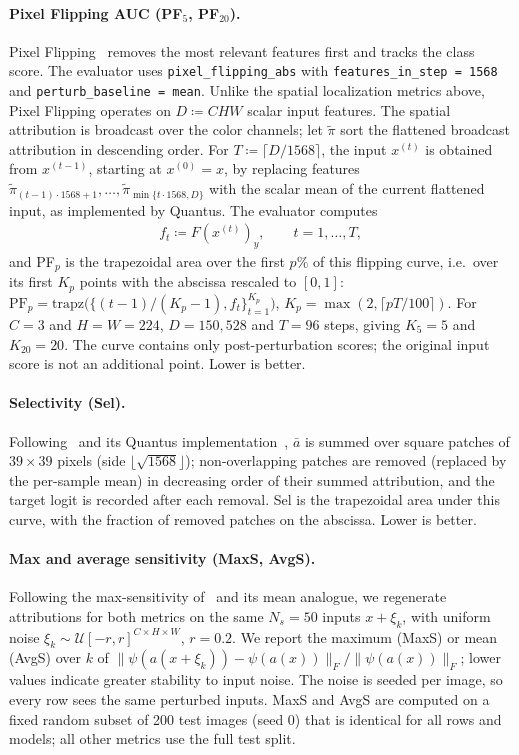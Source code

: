 \paragraph{Pixel Flipping AUC (PF$_5$, PF$_{20}$).} Pixel Flipping~\parencite{Bach2015,Samek2017evaluating} removes the most relevant features first
and tracks the class score. The evaluator uses \texttt{pixel\_flipping\_abs} with
\texttt{features\_in\_step = 1568} and \texttt{perturb\_baseline = mean}. Unlike the spatial
localization metrics above, Pixel Flipping operates on $D \coloneqq CHW$ scalar input features.
The spatial attribution is broadcast over the color channels; let $\widetilde\pi$ sort the
flattened broadcast attribution in descending order. For $T \coloneqq \lceil D/1568 \rceil$, the
input $x^{(t)}$ is obtained from $x^{(t-1)}$, starting at $x^{(0)}=x$, by replacing features
$\widetilde\pi_{(t-1)\cdot1568+1},\dots,\widetilde\pi_{\min\{t\cdot1568,D\}}$ with the scalar mean
of the current flattened input, as implemented by Quantus.
The evaluator computes
\begin{align}
    f_t \coloneqq F(x^{(t)})_y, \qquad t = 1, \dots, T,
\end{align}
and PF$_p$ is the trapezoidal area over the first $p\%$ of this flipping curve, i.e.\ over its
first $K_p$ points with the abscissa rescaled to $[0,1]$: $\text{PF}_p =
    \text{trapz}\bigl(\{(t-1)/(K_p-1), f_t\}_{t=1}^{K_p}\bigr)$, $K_p = \max(2, \lceil pT/100 \rceil)$.
For $C=3$ and $H=W=224$, $D=150{,}528$ and $T=96$ steps, giving $K_5=5$ and $K_{20}=20$.
The curve contains only post-perturbation scores; the original input score is not an additional
point. Lower is better.

\paragraph{Selectivity (Sel).}
Following~\textcite{Montavon2018} and its Quantus implementation~\parencite{Hedstrom2023}, $\bar{a}$ is summed over square patches of $39{\times}39$ pixels (side $\lfloor\sqrt{1568}\rfloor$); non-overlapping patches are removed (replaced by the per-sample mean) in decreasing order of their summed attribution, and the target logit is recorded after each removal. Sel is the trapezoidal area under this curve, with the fraction of removed patches on the abscissa. Lower is better.

\paragraph{Max and average sensitivity (MaxS, AvgS).} Following the max-sensitivity of~\textcite{Yeh2019} and its mean analogue, we regenerate attributions for both metrics on the same $N_s = 50$ inputs $x + \xi_k$, with uniform noise $\xi_k \sim \mathcal{U}[-r, r]^{C \times H
    \times W}$, $r = 0.2$. We report the maximum (MaxS) or mean (AvgS) over $k$ of $\|\psi(a(x+\xi_k)) - \psi(a(x))\|_F / \|\psi(a(x))\|_F$; lower values indicate greater stability to input noise. The noise is seeded per image, so every row sees the same perturbed inputs. MaxS and AvgS are computed on a fixed random subset of 200 test images (seed 0) that is identical for all rows and models; all other metrics use the full test split.

